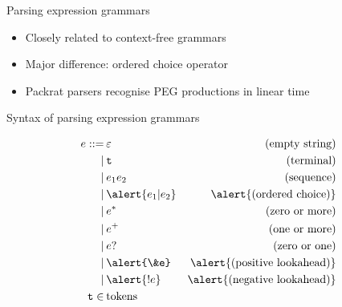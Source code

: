\documentclass[aspectratio=169]{beamer}
\begin{document}
\begin{frame}{Parsing expression grammars}
	\begin{itemize}
		\item Closely related to context-free grammars \pause
		\item Major difference: \alert{ordered choice} operator \pause
		\item Packrat parsers recognise PEG productions in linear time
	\end{itemize}
\end{frame}

\begin{frame}{Syntax of parsing expression grammars}
	\centering
	\begin{overprint}
	\begin{align*}
		e ::= & \hspace{2pt} \varepsilon & \text{(empty string)} \\
		\mid  & \hspace{2pt} \texttt{t}  & \text{(terminal)} \\
		\mid  & \hspace{2pt} e_1 e_2     & \text{(sequence)} \\
		\mid  & \hspace{2pt} \alert{e_1 | e_2} & \alert{\text{(ordered choice)}} \\
		\mid  & \hspace{2pt} e^*         & \text{(zero or more)} \\
		\mid  & \hspace{2pt} e^+         & \text{(one or more)} \\
		\mid  & \hspace{2pt} e?          & \text{(zero or one)} \\
		\mid  & \hspace{2pt} \alert{\&e} & \alert{\text{(positive lookahead)}} \\
		\mid  & \hspace{2pt} \alert{!e}  & \alert{\text{(negative lookahead)}} \\
		\texttt{t} \in & \hspace{2pt} \text{tokens}
	\end{align*}
	\end{overprint}
\end{frame}

\end{document}
